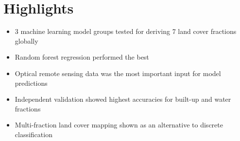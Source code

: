 \documentclass[review,authoryear,3p]{elsarticle}
\begin{document}
\section*{Highlights}
\begin{itemize}
    \item 3 machine learning model groups tested for deriving 7 land cover fractions globally
    \item Random forest regression performed the best
    \item Optical remote sensing data was the most important input for model predictions
    \item Independent validation showed highest accuracies for built-up and water fractions
    \item Multi-fraction land cover mapping shown as an alternative to discrete classification
\end{itemize}
\end{document}
